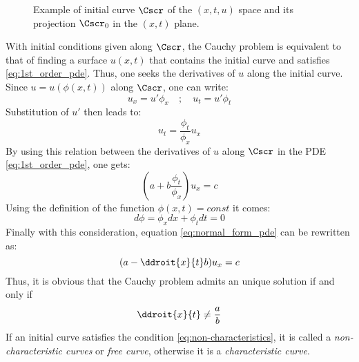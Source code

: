 \begin{figure}[h]
  \centering
  
  \caption{Example of initial curve $\Cscr$ of the $(x,t,u)$ space and its projection $\Cscr_0$ in the $(x,t)$ plane.}
  \label{fig:initial_curve}
\end{figure}
With initial conditions given along $\Cscr$, the Cauchy problem is equivalent to that of finding a surface $u(x,t)$ that contains the initial curve and satisfies \eqref{eq:1st_order_pde}. Thus, one seeks the derivatives of $u$ along the initial curve. Since $u=u(\phi(x,t))$ along $\Cscr$, one can write:
\begin{equation*}
  u_x = u' \phi_x \quad ; \quad u_t = u' \phi_t
\end{equation*}
Substitution of $u'$ then leads to:
\begin{equation*}
  u_t = \frac{\phi_t}{\phi_x}u_x 
\end{equation*}
By using this relation between the derivatives of $u$ along $\Cscr$ in the PDE \eqref{eq:1st_order_pde}, one gets:
\begin{equation}
  \label{eq:normal_form_pde}
  (a + b\frac{\phi_t}{\phi_x})u_x = c
\end{equation}
Using the definition of the function $\phi(x,t)=const$ it comes:
\begin{equation*}
  d\phi = \phi_x dx + \phi_t dt =0
\end{equation*}
Finally with this consideration, equation \eqref{eq:normal_form_pde} can be rewritten as:
\begin{equation}
  \label{eq:normal_form_pde_2}
  (a - \ddroit{x}{t}b)u_x = c
\end{equation}
Thus, it is obvious that the Cauchy problem admits an unique solution if and only if
\begin{equation}
  \label{eq:non-characteristics}
  \ddroit{x}{t}\neq \frac{a}{b}
\end{equation}
If an initial curve satisfies the condition \eqref{eq:non-characteristics}, it is called a \textit{non-characteristic curves} or \textit{free curve}, otherwise it is a \textit{characteristic curve}. 

